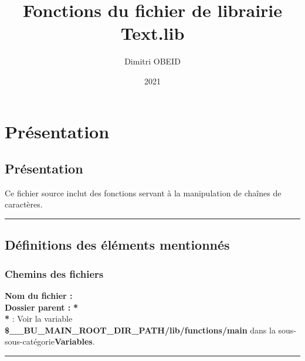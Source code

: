 \documentclass[a4paper,10pt]{article}
\title{\color{sec1}Fonctions du fichier de librairie \color{path}Text.lib}\color{text}
\author{Dimitri OBEID}
\date{2021}
\begin{document}
 \maketitle
 \tableofcontents
 \newpage

\color{sec1}
\section{Présentation}\color{text}

\color{sec2}
\subsection{Présentation}\color{text}
Ce fichier source inclut des fonctions servant à la manipulation de chaînes de caractères.\\[1\baselineskip]




\color{sec2}\par\noindent\rule{\textwidth}{0.4pt}\color{text}

\color{sec2}
\subsection{Définitions des éléments mentionnés}\color{text}

\color{sec3}
\subsubsection{Chemins des fichiers}\color{text}

\textbf{Nom du fichier :} \textbf{\color{path}\color{text}}\\[1\baselineskip]
\textbf{Dossier parent :} \textbf{\color{path}\color{text}*}\\[1\baselineskip]

\textbf{*} : Voir la variable \textbf{\color{vars}\$\_\_BU\_MAIN\_ROOT\_DIR\_PATH/lib/functions/main\color{text}} dans la sous-sous-catégorie\linebreak \textbf{\color{sec3}Variables\color{text}}.\\[1\baselineskip]



\color{sec3}\par\noindent\rule{\textwidth}{0.4pt}\color{text}
\end{document}
